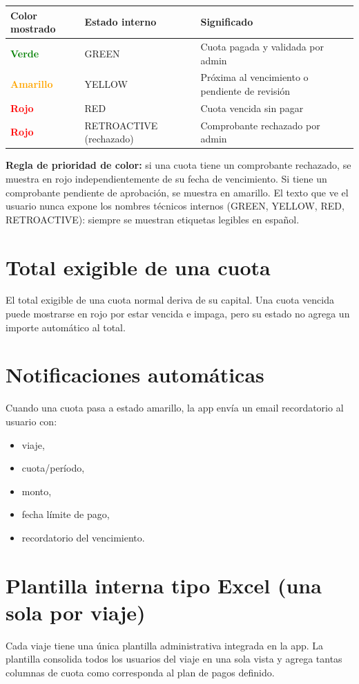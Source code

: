 \documentclass[12pt,a4paper]{article}
\begin{document}
\begin{center}
\begin{tabular}{|l|l|l|}
\hline
\textbf{Color mostrado} & \textbf{Estado interno} & \textbf{Significado} \\
\hline
\textcolor{green}{\textbf{Verde}} & GREEN & Cuota pagada y validada por admin \\
\hline
\textcolor{orange}{\textbf{Amarillo}} & YELLOW & Próxima al vencimiento o pendiente de revisión \\
\hline
\textcolor{red}{\textbf{Rojo}} & RED & Cuota vencida sin pagar \\
\hline
\textcolor{red}{\textbf{Rojo}} & RETROACTIVE (rechazado) & Comprobante rechazado por admin \\
\hline
\end{tabular}
\end{center}

\textbf{Regla de prioridad de color:} si una cuota tiene un comprobante rechazado, se muestra en rojo independientemente de su fecha de vencimiento.
Si tiene un comprobante pendiente de aprobación, se muestra en amarillo.
El texto que ve el usuario nunca expone los nombres técnicos internos (GREEN, YELLOW, RED, RETROACTIVE): siempre se muestran etiquetas legibles en español.

\section{Total exigible de una cuota}
El total exigible de una cuota normal deriva de su capital. Una cuota vencida puede mostrarse en rojo por estar vencida e impaga, pero su estado no agrega un importe automático al total.

\section{Notificaciones automáticas}
Cuando una cuota pasa a estado amarillo, la app envía un email recordatorio al usuario con:
\begin{itemize}[leftmargin=*]
    \item viaje,
    \item cuota/período,
    \item monto,
    \item fecha límite de pago,
    \item recordatorio del vencimiento.
\end{itemize}

\section{Plantilla interna tipo Excel (una sola por viaje)}
Cada viaje tiene una única plantilla administrativa integrada en la app.
La plantilla consolida todos los usuarios del viaje en una sola vista y agrega tantas columnas de cuota como corresponda al plan de pagos definido.
\end{document}
